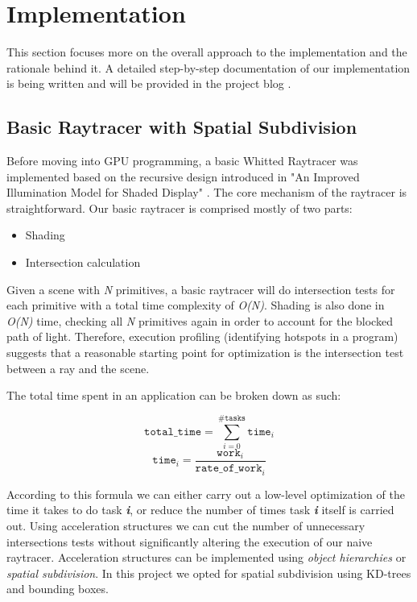\documentclass[letterpaper, 10 pt, conference]{ieeeconf}  %
\begin{document}
\section{Implementation}
This section focuses more on the overall approach to the implementation and the rationale behind it. A detailed step-by-step documentation of our implementation is being written and will be provided in the project blog \cite{c2}.
\subsection{Basic Raytracer with Spatial Subdivision}
 Before moving into GPU programming, a basic Whitted Raytracer was implemented based on the recursive design introduced in "An Improved Illumination Model for Shaded Display"\cite{c1} . The core mechanism of the raytracer is straightforward. Our basic raytracer is comprised mostly of two parts:
 
\begin{itemize}
\item Shading
\item Intersection calculation
\end{itemize}
 
Given a scene with \textit{N} primitives, a basic raytracer will do intersection tests for each primitive with a total time complexity of \textit{O(N)}. Shading is also done in \textit{O(N)} time, checking all \textit{N} primitives again in order to account for the blocked path of light. Therefore, execution profiling (identifying hotspots in a program) suggests that a reasonable starting point for optimization is the intersection test between a ray and the scene.

The total time spent in an application can be broken down as such\cite{c3}:

\[\mathtt{total\_time} = \sum_{i=0} ^{\#\mathtt{tasks}}\mathtt{time}_i\]
\[\mathtt{time}_i= \frac{\mathtt{work}_i}{\mathtt{rate\_of\_work}_i}\]

According to this formula we can either carry out a low-level optimization of the time it takes to do task \textit{\textbf{i}}, or reduce the number of times task \textit{\textbf{i}} itself is carried out. Using acceleration structures we can cut the number of unnecessary intersections tests without significantly altering the execution of our naive raytracer. Acceleration structures can be implemented using \textit{object hierarchies} or \textit{spatial subdivision}. In this project we opted for spatial subdivision using KD-trees and bounding boxes.
\end{document}
